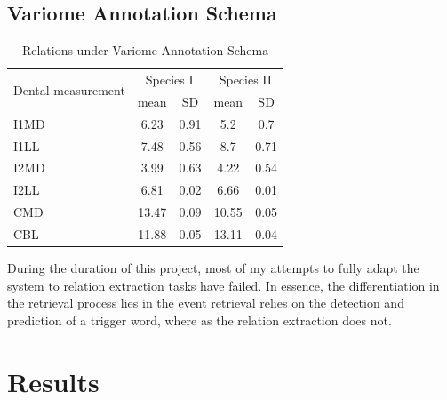 \subsection{Variome Annotation Schema}
\begin{table}
	\caption{Relations under Variome Annotation Schema}
	\centering
	\label{table:relations}
	\begin{tabular}{l c c c c}
		\hline 
		\multirow{2}{*}{Dental measurement} & \multicolumn{2}{c}{Species I} & \multicolumn{2}{c}{Species II} \\ 
		\cline{2-5}
		& mean & SD  & mean & SD  \\ 
		\hline
		I1MD & 6.23 & 0.91 & 5.2  & 0.7  \\
		
		I1LL & 7.48 & 0.56 & 8.7  & 0.71 \\
		
		I2MD & 3.99 & 0.63 & 4.22 & 0.54 \\
		
		I2LL & 6.81 & 0.02 & 6.66 & 0.01 \\
		
		CMD & 13.47 & 0.09 & 10.55 & 0.05 \\
		
		CBL & 11.88 & 0.05 & 13.11 & 0.04\\ 
		\hline 
	\end{tabular}
\end{table}

During the duration of this project, most of my attempts to fully adapt the system to relation extraction tasks have failed. In essence, the differentiation in the retrieval process lies in the event retrieval relies on the detection and prediction of a trigger word, where as the relation extraction does not. 

\section{Results}

